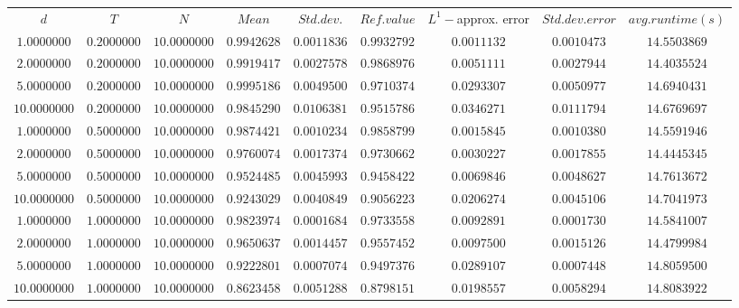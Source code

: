 \begin{tabular}{ccccccccc}
$d$ & $T$ & $N$ & $Mean$ & $Std. dev.$ & $Ref. value$ & $L^1-$approx. error & $Std. dev. error$ & $avg. runtime (s)$\\
$1.0000000$ & $0.2000000$ & $10.0000000$ & $0.9942628$ & $0.0011836$ & $0.9932792$ & $0.0011132$ & $0.0010473$ & $14.5503869$\\
$2.0000000$ & $0.2000000$ & $10.0000000$ & $0.9919417$ & $0.0027578$ & $0.9868976$ & $0.0051111$ & $0.0027944$ & $14.4035524$\\
$5.0000000$ & $0.2000000$ & $10.0000000$ & $0.9995186$ & $0.0049500$ & $0.9710374$ & $0.0293307$ & $0.0050977$ & $14.6940431$\\
$10.0000000$ & $0.2000000$ & $10.0000000$ & $0.9845290$ & $0.0106381$ & $0.9515786$ & $0.0346271$ & $0.0111794$ & $14.6769697$\\
$1.0000000$ & $0.5000000$ & $10.0000000$ & $0.9874421$ & $0.0010234$ & $0.9858799$ & $0.0015845$ & $0.0010380$ & $14.5591946$\\
$2.0000000$ & $0.5000000$ & $10.0000000$ & $0.9760074$ & $0.0017374$ & $0.9730662$ & $0.0030227$ & $0.0017855$ & $14.4445345$\\
$5.0000000$ & $0.5000000$ & $10.0000000$ & $0.9524485$ & $0.0045993$ & $0.9458422$ & $0.0069846$ & $0.0048627$ & $14.7613672$\\
$10.0000000$ & $0.5000000$ & $10.0000000$ & $0.9243029$ & $0.0040849$ & $0.9056223$ & $0.0206274$ & $0.0045106$ & $14.7041973$\\
$1.0000000$ & $1.0000000$ & $10.0000000$ & $0.9823974$ & $0.0001684$ & $0.9733558$ & $0.0092891$ & $0.0001730$ & $14.5841007$\\
$2.0000000$ & $1.0000000$ & $10.0000000$ & $0.9650637$ & $0.0014457$ & $0.9557452$ & $0.0097500$ & $0.0015126$ & $14.4799984$\\
$5.0000000$ & $1.0000000$ & $10.0000000$ & $0.9222801$ & $0.0007074$ & $0.9497376$ & $0.0289107$ & $0.0007448$ & $14.8059500$\\
$10.0000000$ & $1.0000000$ & $10.0000000$ & $0.8623458$ & $0.0051288$ & $0.8798151$ & $0.0198557$ & $0.0058294$ & $14.8083922$\\
\end{tabular}
